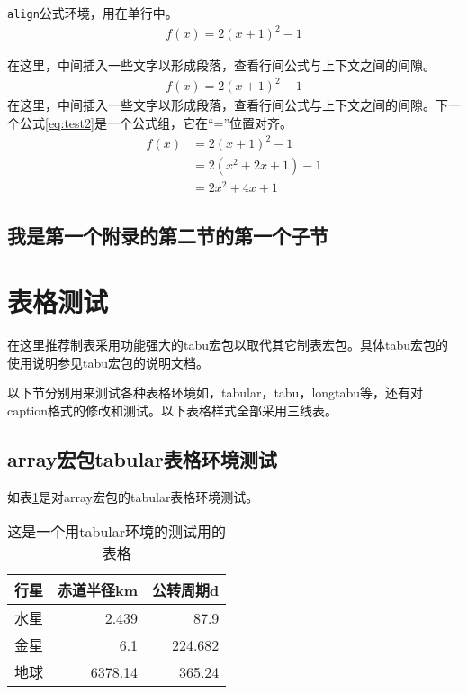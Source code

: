 \texttt{align}公式环境，用在单行中。
\begin{align}\label{eq:test1}
	f(x) = 2(x + 1)^{2} - 1
\end{align}

在这里，中间插入一些文字以形成段落，查看行间公式与上下文之间的间隙。
\begin{align*}
	f(x) = 2(x + 1)^{2} - 1
\end{align*}
在这里，中间插入一些文字以形成段落，查看行间公式与上下文之间的间隙。下一个公式\eqref{eq:test2}是一个公式组，它在“=”位置对齐。
\begin{align}\label{eq:test2}
	f(x) & = 2(x + 1)^{2} - 1\\
		 & = 2(x^{2} + 2x +1)-1\\
		 & = 2x^{2} + 4x + 1
\end{align}

\subsection{我是第一个附录的第二节的第一个子节}

\section{表格测试}
在这里推荐制表采用功能强大的tabu宏包以取代其它制表宏包。具体tabu宏包的使用说明参见tabu宏包的说明文档。

以下节分别用来测试各种表格环境如，tabular，tabu，longtabu等，还有对caption格式的修改和测试。以下表格样式全部采用三线表。

\subsection{array宏包tabular表格环境测试}
如表\ref{tab:first_table_test}是对array宏包的tabular表格环境测试。
\begin{table}[htbp]
	\centering
	\caption{这是一个用tabular环境的测试用的表格}\label{tab:first_table_test}
    \begin{tabular}{lrr}
    \toprule
    \textbf{行星}     & \textbf{赤道半径}km & \textbf{公转周期}d \\
    \midrule
    水星     & 2.439  & 87.9 \\
    金星     & 6.1    & 224.682 \\
    地球     & 6378.14 & 365.24 \\
    \bottomrule
    \end{tabular}%
\end{table}


